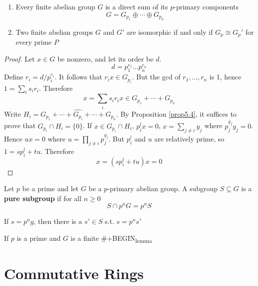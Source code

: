 \documentclass[11pt]{article}
\begin{document}
\begin{theorem}
\begin{enumerate}
\item Every finite abelian group \(G\) is a direct sum of its \(p\)-primary
components
\begin{equation*}
G=G_{p_1}\oplus\cdots\oplus G_{p_n}
\end{equation*}
\item Two finite abelian groups \(G\) and \(G'\) are isomorphic if and only if
\(G_p\cong G_p'\) for every prime \(P\)
\end{enumerate}
\end{theorem}

\begin{proof}
Let \(x\in G\) be nonzero, and let its order be \(d\).
\begin{equation*}
d=p_1^{e_1}\dots p_n^{e_n}
\end{equation*}
Define \(r_i=d/p_i^{e_i}\). It follows that \(r_ix\in G_{p_i}\). But the gcd
of \(r_1,\dots,r_n\) is 1, hence \(1=\sum_is_ir_i\). Therefore
\begin{equation*}
x=\displaystyle\sum_{i}s_ir_ix\in G_{p_1}+\cdots+G_{p_n}
\end{equation*}
Write \(H_i=G_{p_1}+\cdots+\widehat{G_{p_i}}+\cdots+G_{p_n}\). By
Proposition \ref{prop5.4}, it suffices to prove that 
\(G_{p_i}\cap H_i=\{0\}\). If \(x\in G_{p_i}\cap H_i\), \(p_i^lx=0\), 
\(x=\sum_{j\neq i}y_j\) where \(p_j^{g_j}y_j=0\). Hence 
\(ux=0\) where \(u=\prod_{j\neq i}p_j^{g_j}\). But \(p_i^l\) and \(u\) are
relatively prime, so \(1=sp_i^l+tu\). Therefore
\begin{equation*}
x=(sp_i^l+tu)x=0
\end{equation*}
\end{proof}

\begin{definition}[]
Let \(p\) be a prime and let \(G\) be a \(p\)-primary abelian group. A subgroup
\(S\subseteq G\) is a \textbf{pure subgroup} if for all \(n\ge 0\)
\begin{equation*}
S\cap p^nG=p^nS
\end{equation*}
\end{definition}

If \(s=p^ng\), then there is a \(s'\in S\) s.t. \(s=p^ns'\)

\begin{lemma}[]
If \(p\) is a prime and \(G\) is a finite 
\#+BEGIN\textsubscript{lemma}
\end{lemma}
\section{Commutative Rings }
\label{sec:org5875fa5}
\end{document}
